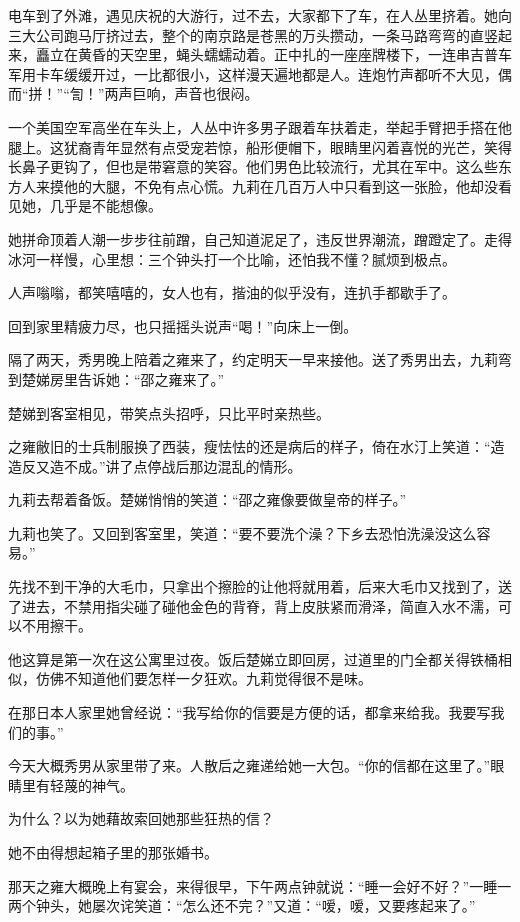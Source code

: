 \par 电车到了外滩，遇见庆祝的大游行，过不去，大家都下了车，在人丛里挤着。她向三大公司跑马厅挤过去，整个的南京路是苍黑的万头攒动，一条马路弯弯的直竖起来，矗立在黄昏的天空里，蝇头蠕蠕动着。正中扎的一座座牌楼下，一连串吉普车军用卡车缓缓开过，一比都很小，这样漫天遍地都是人。连炮竹声都听不大见，偶而“拼！”“訇！”两声巨响，声音也很闷。
\par 一个美国空军高坐在车头上，人丛中许多男子跟着车扶着走，举起手臂把手搭在他腿上。这犹裔青年显然有点受宠若惊，船形便帽下，眼睛里闪着喜悦的光芒，笑得长鼻子更钩了，但也是带窘意的笑容。他们男色比较流行，尤其在军中。这么些东方人来摸他的大腿，不免有点心慌。九莉在几百万人中只看到这一张脸，他却没看见她，几乎是不能想像。
\par 她拼命顶着人潮一步步往前蹭，自己知道泥足了，违反世界潮流，蹭蹬定了。走得冰河一样慢，心里想：三个钟头打一个比喻，还怕我不懂？腻烦到极点。
\par 人声嗡嗡，都笑嘻嘻的，女人也有，揩油的似乎没有，连扒手都歇手了。
\par 回到家里精疲力尽，也只摇摇头说声“喝！”向床上一倒。
\par 隔了两天，秀男晚上陪着之雍来了，约定明天一早来接他。送了秀男出去，九莉弯到楚娣房里告诉她：“邵之雍来了。”
\par 楚娣到客室相见，带笑点头招呼，只比平时亲热些。
\par 之雍敝旧的士兵制服换了西装，瘦怯怯的还是病后的样子，倚在水汀上笑道：“造造反又造不成。”讲了点停战后那边混乱的情形。
\par 九莉去帮着备饭。楚娣悄悄的笑道：“邵之雍像要做皇帝的样子。”
\par 九莉也笑了。又回到客室里，笑道：“要不要洗个澡？下乡去恐怕洗澡没这么容易。”
\par 先找不到干净的大毛巾，只拿出个擦脸的让他将就用着，后来大毛巾又找到了，送了进去，不禁用指尖碰了碰他金色的背脊，背上皮肤紧而滑泽，简直入水不濡，可以不用擦干。
\par 他这算是第一次在这公寓里过夜。饭后楚娣立即回房，过道里的门全都关得铁桶相似，仿佛不知道他们要怎样一夕狂欢。九莉觉得很不是味。
\par 在那日本人家里她曾经说：“我写给你的信要是方便的话，都拿来给我。我要写我们的事。”
\par 今天大概秀男从家里带了来。人散后之雍递给她一大包。“你的信都在这里了。”眼睛里有轻蔑的神气。
\par 为什么？以为她藉故索回她那些狂热的信？
\par 她不由得想起箱子里的那张婚书。
\par 那天之雍大概晚上有宴会，来得很早，下午两点钟就说：“睡一会好不好？”一睡一两个钟头，她屡次诧笑道：“怎么还不完？”又道：“嗳，嗳，又要疼起来了。”
